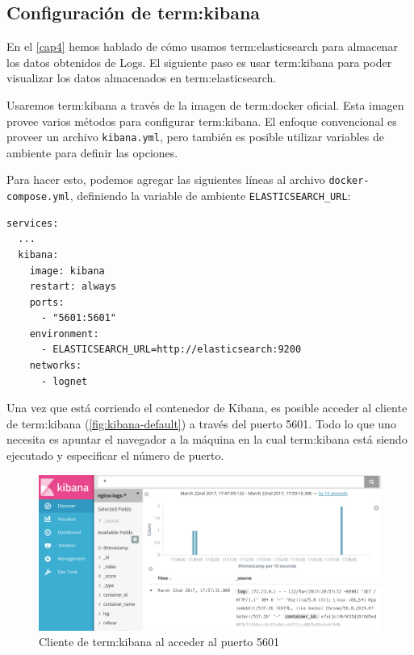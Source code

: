 \subsection{Configuración de \gls{term:kibana}}
\label{configuracion-de-kibana}

En el \autoref{cap4} hemos hablado de cómo usamos \gls{term:elasticsearch} para
almacenar los datos obtenidos de Logs. El siguiente paso es usar
\gls{term:kibana} para poder visualizar los datos almacenados en
\gls{term:elasticsearch}.

Usaremos \gls{term:kibana} a través de la imagen de \gls{term:docker} oficial.
Esta imagen provee varios métodos para configurar \gls{term:kibana}. El enfoque
convencional es proveer un archivo \lstinline{kibana.yml}, pero también es
posible utilizar variables de ambiente para definir las opciones.

Para hacer esto, podemos agregar las siguientes líneas al archivo
\texttt{docker-compose.yml}, definiendo la variable de ambiente
\lstinline{ELASTICSEARCH_URL}:

\begin{lstlisting}
services:
  ...
  kibana:
    image: kibana
    restart: always
    ports:
      - "5601:5601"
    environment:
      - ELASTICSEARCH_URL=http://elasticsearch:9200
    networks:
      - lognet
\end{lstlisting}

Una vez que está corriendo el contenedor de Kibana, es posible acceder al
cliente  de \gls{term:kibana} (\autoref{fig:kibana-default}) a través
del puerto 5601. Todo lo que uno necesita es apuntar el navegador  a la
máquina en la cual \gls{term:kibana} está siendo ejecutado y especificar el
número de puerto.

\begin{figure}
  \includegraphics[width=\linewidth]{src/images/05-capitulo-5/kibanadefault.jpg}
  \caption{Cliente de \gls{term:kibana} al acceder al puerto 5601}
  \label{fig:kibana-default}
\end{figure}

